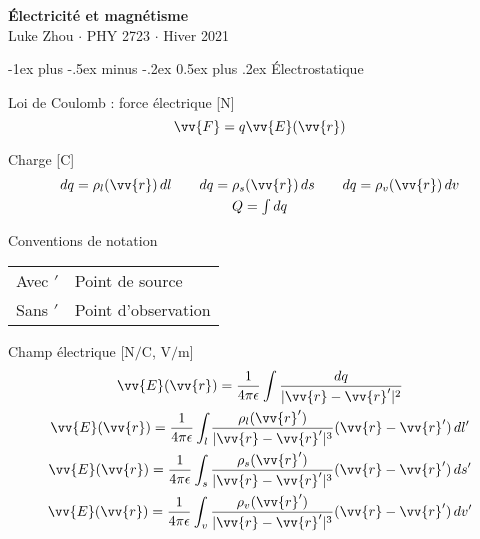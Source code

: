 \documentclass[10pt,landscape]{article}
\makeatletter
\renewcommand{\section}{\@startsection{section}{1}{0mm}%
                                {-1ex plus -.5ex minus -.2ex}%
                                {0.5ex plus .2ex}%
                                {\normalfont\large\bfseries}}
\newcommand{\extraline}{\vspace{1em}}
\newcommand{\halfline}{\vspace{0.5em}}
\newcommand{\tableindent}{\hspace{1.5em}}
\newcommand{\uvec}[1]{\ensuremath{\boldsymbol{\hat{#1}}}}
\makeatother
\begin{document}
\raggedright
\footnotesize
\begin{multicols}{3}

\setlength{\premulticols}{1pt}
\setlength{\postmulticols}{1pt}
\setlength{\multicolsep}{1pt}
\setlength{\columnsep}{2pt}

\begin{center}
     \Large{\textbf{Électricité et magnétisme}} \\
     \small{Luke Zhou $\cdot$ PHY 2723 $\cdot$ Hiver 2021}
\end{center}

\section{Électrostatique}

Loi de Coulomb : force électrique [\si{\newton}]
 \[ \vv{F} = q\vv{E}(\vv{r}) \] %

Charge  [\si{\coulomb}]
\begin{gather*} 
dq = \rho_l(\vv{r}) \,dl  \qquad  dq = \rho_s(\vv{r}) \,ds  \qquad dq = \rho_v(\vv{r}) \,dv  \\
 \textstyle Q = \int dq 
\end{gather*}

Conventions de notation  \\
\halfline
\begin{tabular}{@{\tableindent}ll@{}}
	Avec $'$ & Point de source\\
	Sans $'$ & Point d'observation \\
\end{tabular}

\extraline
Champ électrique [$\si{\newton/\coulomb}$, $\si{\volt/\metre}$]
\begin{gather*}
\vv{E}(\vv{r}) = \frac{1}{4\pi\epsilon} \int \frac{dq}{| \vv{r} - \vv{r}' |^2 }  \\
%
 \vv{E}(\vv{r}) = \frac{1}{4\pi\epsilon} \int_{l} \frac{\rho_l(\vv{r}')}{| \vv{r} - \vv{r}' |^3 } (\vv{r} - \vv{r}' )\,dl'  \\
%
\vv{E}(\vv{r}) = \frac{1}{4\pi\epsilon} \int_{s} \frac{\rho_s(\vv{r}')}{| \vv{r} - \vv{r}'|^3 } (\vv{r} - \vv{r}' )\,ds' \\
%
\vv{E}(\vv{r}) = \frac{1}{4\pi\epsilon} \int_{v} \frac{\rho_v(\vv{r}')}{| \vv{r} - \vv{r}' |^3 } (\vv{r} - \vv{r}' )\,dv'  
\end{gather*}
	

\end{multicols}
\end{document}

